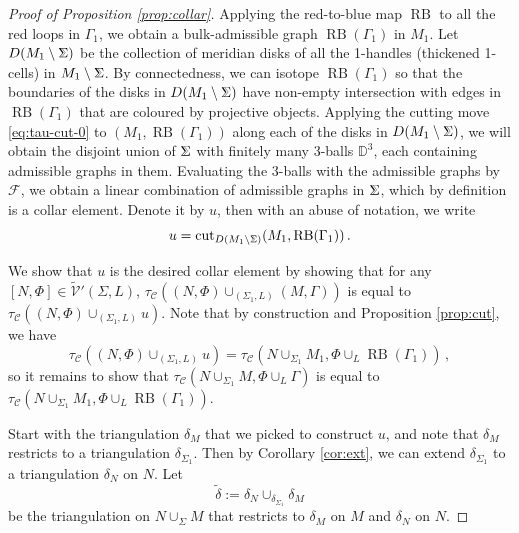 \documentclass[11pt]{amsart}
\theoremstyle{definition}
\numberwithin{equation}{section}
\def\rb{\operatorname{RB}}
\def\cgpt{\mathscr{F}}
\def\cut{{\operatorname{cut}}}
\def\ourV{\cV}
\def\tbv{\widetilde{\ourV}}
\newcommand{\bbSigma}{%
  \mathord{
    \tikz[baseline=(char.base)]{
      \node[inner sep=0pt] (char) {$\Sigma$}; %
\begin{scope}[xshift=0.5]
      \draw[line width=0.3pt] (-0.05,0.115)--(0.03,0.002);
      \draw[line width=0.3pt] (-0.06,-0.115)--(0.035,0.004);
\end{scope}
    }
  }
}
\newcommand\scalemath[2]{\scalebox{#1}{\mbox{\ensuremath{\displaystyle #2}}}}
\newcommand{\smbbSigma}{\scalemath{0.7}{\bbSigma}}
\def\cC{\mathcal{C}}
\def\cV{\mathcal{V}}
\def\bD{{\mathbb{D}}}
\def\de{\delta}
\begin{document}
\begin{proof}[Proof of Proposition \ref{prop:collar}]
Applying the red-to-blue map $\operatorname{RB}$ to all the red loops in $\Gamma_1$, we obtain a bulk-admissible
graph $\rb(\Gamma_1)$ in $M_1$. Let $D(M_1\setminus\bbSigma)$ be the collection of meridian disks of all the 1-handles (thickened 1-cells) in $M_1\setminus\bbSigma$. By connectedness, we can isotope $\rb(\Gamma_1)$ so that the boundaries of the disks in $D(M_1\setminus\bbSigma)$ have non-empty intersection with edges in $\rb(\Gamma_1)$ that are coloured by projective objects. Applying the cutting move \eqref{eq:tau-cut-0} to $(M_1, \rb(\Gamma_1))$ along each of the disks in $D(M_1\setminus\bbSigma)$, we will obtain the disjoint union of $\bbSigma$ with finitely many 3-balls $\bD^3$, each containing admissible graphs in them. Evaluating the 3-balls with the admissible graphs by $\cgpt$, we obtain a linear combination of admissible graphs in $\bbSigma$, which by definition is a collar element. Denote it by $u$, then with an abuse of notation, we write 
\[u = \cut_{D(M_1\setminus\smbbSigma)}(M_1, \rb(\Gamma_1))\,.\]


We show that $u$ is the desired collar element by showing that for any $[N, \Phi] \in \tbv'(\Sigma, L)$, $\tau_{\cC}((N, \Phi)\cup_{(\Sigma_1, L)}(M, \Gamma))$ is equal to $\tau_{\cC}((N, \Phi) \cup_{(\Sigma_1, L)} u)$. Note that by construction and Proposition \ref{prop:cut}, we have 
\begin{equation}\label{eq:u-M1}
\tau_{\cC}((N, \Phi) \cup_{(\Sigma_1, L)} u) = \tau_{\cC}(N\cup_{\Sigma_1}M_1, \Phi\cup_{L}\rb(\Gamma_1))\,,
\end{equation}
so it remains to show that $\tau_{\cC}(N\cup_{\Sigma_1}M, \Phi\cup_L \Gamma)$ is equal to $\tau_{\cC}(N\cup_{\Sigma_1}M_1, \Phi\cup_{L} \rb(\Gamma_1))$.


Start with the triangulation $\de_M$ that we picked to construct $u$, and note that $\de_{M}$ restricts to a triangulation $\de_{\Sigma_1}$. Then by Corollary \ref{cor:ext}, we can extend $\de_{\Sigma_1}$ to a triangulation 
$\de_N$ on $N$. Let 
\[\tilde{\de} := \de_N \cup_{\de_{\Sigma_1}} \de_M\]
be the triangulation on $N \cup_{\Sigma} M$ that restricts to $\de_M$ on $M$ and $\de_N$ on $N$.


\end{proof}
\end{document}
